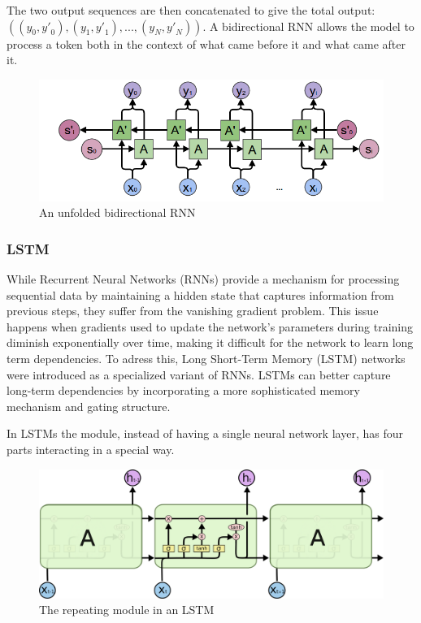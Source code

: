 \documentclass{article}
\begin{document}
The two output sequences are then concatenated to give the total output: $((y_0, {y'}_0), (y_1, {y'}_1), ..., (y_N, {y'}_N))$.
A bidirectional RNN allows the model to process a token both in the context of what came before it and what came after it.

\begin{figure}[htbp]
  \centering
  \includegraphics[width=0.8\linewidth]{img/rnn_bidirectional.png}
  \caption{An unfolded bidirectional RNN}
  \label{fig:rnn_bidirectional}
\end{figure}

\subsubsection{LSTM}
\label{sec:lstm}

While Recurrent Neural Networks (RNNs) provide a mechanism for processing sequential data by maintaining a hidden state that captures information from previous steps, they suffer from the vanishing gradient problem.
This issue happens when gradients used to update the network's parameters during training diminish exponentially over time, making it difficult for the network to learn long term dependencies.
To adress this, Long Short-Term Memory (LSTM) networks were introduced as a specialized variant of RNNs.
LSTMs can better capture long-term dependencies by incorporating a more sophisticated memory mechanism and gating structure.

In LSTMs the module, instead of having a single neural network layer, has four parts interacting in a special way.

\begin{figure}[htbp]
  \centering
  \includegraphics[width=0.8\linewidth]{img/lstm_chain.png}
  \caption{The repeating module in an LSTM}
  \label{fig:lstm_chain}
\end{figure}
\end{document}
